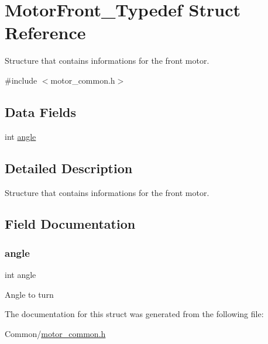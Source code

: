 \hypertarget{struct_motor_front___typedef}{}\section{Motor\+Front\+\_\+\+Typedef Struct Reference}
\label{struct_motor_front___typedef}


Structure that contains informations for the front motor.  




{\ttfamily \#include $<$motor\+\_\+common.\+h$>$}

\subsection*{Data Fields}
\begin{DoxyCompactItemize}
\item 
int \hyperlink{struct_motor_front___typedef_a63177970cacb40efba67ce501ea89210}{angle}
\end{DoxyCompactItemize}


\subsection{Detailed Description}
Structure that contains informations for the front motor. 

\subsection{Field Documentation}
\mbox{\label{struct_motor_front___typedef_a63177970cacb40efba67ce501ea89210}} 
\subsubsection{\texorpdfstring{angle}{angle}}
{\footnotesize\ttfamily int angle}

Angle to turn 

The documentation for this struct was generated from the following file\+:\begin{DoxyCompactItemize}
\item 
Common/\hyperlink{motor__common_8h}{motor\+\_\+common.\+h}\end{DoxyCompactItemize}
